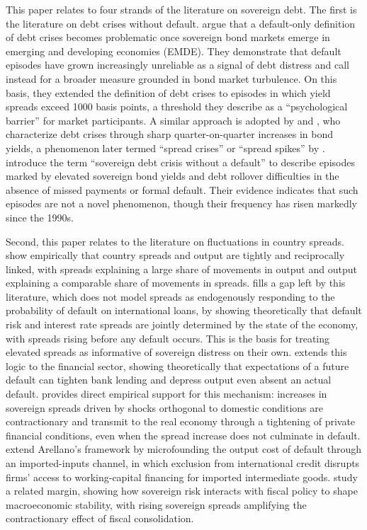 \documentclass[12pt]{article}
\begin{document}
This paper relates to four strands of the literature on sovereign debt.
The first is the literature on debt crises without default.
\citet{pescatori2007adequately} argue that a default-only definition of
debt crises becomes problematic once sovereign bond markets emerge in
emerging and developing economies (EMDE). They demonstrate that default
episodes have grown increasingly unreliable as a signal of debt distress
and call instead for a broader measure grounded in bond market
turbulence. On this basis, they extended the definition of debt crises
to episodes in which yield spreads exceed 1000 basis points, a threshold
they describe as a ``psychological barrier'' for market participants. A
similar approach is adopted by \citet{broner2013why} and \citet{aguiar2016quantitative}, who characterize debt crises through sharp
quarter-on-quarter increases in bond yields, a phenomenon later termed
``spread crises'' or ``spread spikes'' by \citet{krishnamurthy2017credit}. \citet{mitchener2021sovereign} introduce the term
``sovereign debt crisis without a default'' to describe episodes marked
by elevated sovereign bond yields and debt rollover difficulties in the
absence of missed payments or formal default. Their evidence indicates
that such episodes are not a novel phenomenon, though their frequency
has risen markedly since the 1990s.

Second, this paper relates to the literature on fluctuations in country
spreads. \citet{uribeyue2006country} show empirically that country
spreads and output are tightly and reciprocally linked, with spreads
explaining a large share of movements in output and output explaining a
comparable share of movements in spreads. \citet{arellano2008default}
fills a gap left by this literature, which does not model spreads as
endogenously responding to the probability of default on international
loans, by showing theoretically that default risk and interest rate
spreads are jointly determined by the state of the economy, with
spreads rising before any default occurs. This is the basis for
treating elevated spreads as informative of sovereign distress on their
own. \citet{bocola2016passthrough} extends this logic to the financial
sector, showing theoretically that expectations of a future default can
tighten bank lending and depress output even absent an actual default.
\citet{bahaj2020sovereign} provides direct empirical support for this
mechanism: increases in sovereign spreads driven by shocks orthogonal
to domestic conditions are contractionary and transmit to the real
economy through a tightening of private financial conditions, even when
the spread increase does not culminate in default. \citet{mendozayue2012general} extend Arellano's framework by
microfounding the output cost of default through an imported-inputs
channel, in which exclusion from international credit disrupts firms'
access to working-capital financing for imported intermediate goods.
\citet{corsetti2013sovereign} study a related margin, showing how
sovereign risk interacts with fiscal policy to shape macroeconomic
stability, with rising sovereign spreads amplifying the contractionary
effect of fiscal consolidation.
\end{document}
